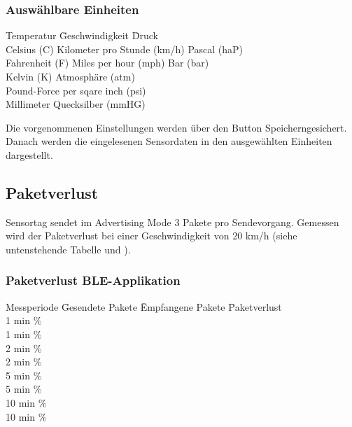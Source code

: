 \subsubsection*{Auswählbare Einheiten}
\begin{tabbing}
    Temperatur     \quad\= Geschwindigkeit            \quad\= Druck \\[0.8ex]
    Celsius (C)    \> Kilometer pro Stunde (km/h)\> Pascal (haP)\\
    Fahrenheit (F) \> Miles per hour (mph)       \> Bar (bar)\\
    Kelvin (K)     \>                            \> Atmosph\"{a}re (atm)\\
                   \>                      \> Pound-Force per sqare inch (psi)\\
                   \>                      \> Millimeter Quecksilber (mmHG)\\
\end{tabbing} 

  
Die vorgenommenen Einstellungen werden über den Button \glqq Speichern\grqq gesichert. Danach werden die eingelesenen Sensordaten in den ausgewählten Einheiten dargestellt.

\subsection{Paketverlust}

Sensortag sendet im Advertising Mode 3 Pakete pro Sendevorgang. Gemessen wird der Paketverlust bei einer Geschwindigkeit von 20 km/h (siehe untenstehende Tabelle und ).   

\subsubsection*{Paketverlust BLE-Applikation}
\begin{tabbing}
    Messperiode \quad\= Gesendete Pakete \quad\= Empfangene Pakete \quad\= Paketverlust\\[0.8ex]
    1 min      \thinspace\%  \\
    1 min      \thinspace\%  \\
    2 min      \thinspace\%  \\
    2 min      \thinspace\%  \\
    5 min      \thinspace\%  \\
    5 min      \thinspace\%  \\
    10 min      \thinspace\%  \\
    10 min      \thinspace\%  \\
\end{tabbing} 

